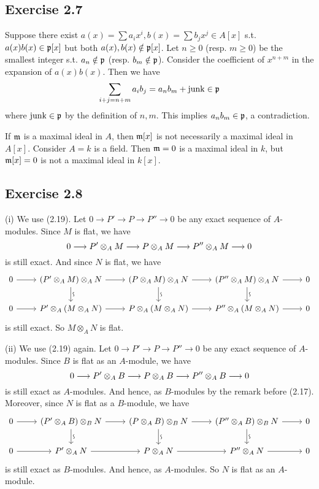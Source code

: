 \documentclass[../A&M.tex]{subfiles}
\begin{document}
\subsection*{Exercise 2.7}

Suppose there exist $a(x) = \sum a_ix^i, b(x) = \sum b_jx^j \in A[x]$ s.t. $a(x)b(x) \in \mathfrak{p}[x]$ but both $a(x),b(x) \notin \mathfrak{p}[x]$. Let $n\geq0$ (resp. $m\geq0$) be the smallest integer s.t. $a_n \notin \mathfrak{p}$ (resp. $b_m \notin \mathfrak{p}$). Consider the coefficient of $x^{n+m}$ in the expansion of $a(x)b(x)$. Then we have
$$
\sum_{i+j = n+m} a_ib_j = a_nb_m + \operatorname{junk} \in \mathfrak{p}
$$
where $\operatorname{junk} \in \mathfrak{p}$ by the definition of $n,m$. This implies $a_nb_m \in \mathfrak{p}$, a contradiction.

If $\mathfrak{m}$ is a maximal ideal in $A$, then $\mathfrak{m}[x]$ is not necessarily a maximal ideal in $A[x]$. Consider $A=k$ is a field. Then $\mathfrak{m} = 0$ is a maximal ideal in $k$, but $\mathfrak{m}[x] = 0$ is not a maximal ideal in $k[x]$.

\subsection*{Exercise 2.8}

(i) We use (2.19). Let $0 \to P' \to P \to P'' \to 0$ be any exact sequence of $A$-modules. Since $M$ is flat, we have
$$
0 \longrightarrow P' \otimes_A M \longrightarrow P \otimes_A M \longrightarrow P'' \otimes_A M \longrightarrow 0
$$
is still exact. And since $N$ is flat, we have
$$
\begin{tikzcd}
0 \arrow{r} & (P' \otimes_A M) \otimes_A N \arrow{r} \visoarrow{d} &  (P \otimes_A M) \otimes_A N \arrow{r} \visoarrow{d} &  (P'' \otimes_A M) \otimes_A N \arrow{r} \visoarrow{d} & 0 \\ 
0 \arrow{r} & P' \otimes_A (M \otimes_A N) \arrow{r} & P \otimes_A (M \otimes_A N) \arrow{r} & P'' \otimes_A (M \otimes_A N) \arrow[r] & 0
\end{tikzcd}
$$
is still exact. So $M \otimes_A N$ is flat.

(ii) We use (2.19) again. Let $0 \to P' \to P \to P'' \to 0$ be any exact sequence of $A$-modules. Since $B$ is flat as an $A$-module, we have
$$
0 \longrightarrow P' \otimes_A B \longrightarrow P \otimes_A B \longrightarrow P'' \otimes_A B \longrightarrow 0
$$
is still exact as $A$-modules. And hence, as $B$-modules by the remark before (2.17). Moreover, since $N$ is flat as a $B$-module, we have
$$
\begin{tikzcd}
0 \arrow{r} & (P' \otimes_A B) \otimes_B N \arrow{r} \visoarrow{d} &  (P \otimes_A B) \otimes_B N \arrow{r} \visoarrow{d} &  (P'' \otimes_A B) \otimes_B N \arrow{r} \visoarrow{d} & 0 \\ 
0 \arrow{r} & P' \otimes_A N \arrow{r} & P \otimes_A N \arrow{r} & P'' \otimes_A N \arrow[r] & 0
\end{tikzcd}
$$
is still exact as $B$-modules. And hence, as $A$-modules. So $N$ is flat as an $A$-module.
\end{document}
